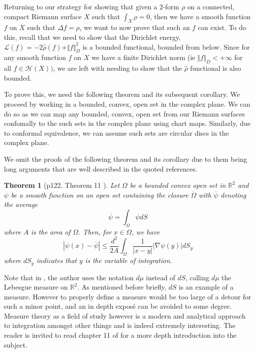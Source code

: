 \documentclass[11pt]{report}
\newtheorem{thm}{Theorem}[section]
\theoremstyle{definition}
\begin{document}
Returning to our strategy for showing that given a $2$-form $\rho$ on a connected, compact Riemann surface $X$ such that $\int_X \rho = 0$, then we have a smooth function $f$ on $X$ such that $\Delta f = \rho$, we want to now prove that such an $f$ can exist. To do this, recall that we need to show that the Dirichlet energy, $\mathcal{L}(f) = -2\hat{\rho}(f) + \Vert f \Vert^2_D$ is a bounded functional, bounded from below. Since for any smooth function $f$ on $X$ we have a finite Dirichlet norm (ie $\Vert f \Vert_D < +\infty $ for all $f \in \mathcal{H}(X))$, %
we are left with needing to show that the $\hat{\rho}$ functional is also bounded.

To prove this, we need the following theorem and its subsequent corollary. We proceed by working in a bounded, convex, open set in the complex plane. We can do so as we can map any bounded, convex, open set from our Riemann surfaces confomally to the such sets in the complex plane using chart maps. Similarly, due to conformal equivalence, we can assume such sets are circular discs in the complex plane.

We omit the proofs of the following theorem and its corollary due to them being long arguments that are well described in the quoted references.
\begin{thm}[p122. Theorem 11 \cite{donaldson}]\label{quotedTheorem11}
  Let $\Omega$ be a bounded convex open set in $\mathbb{R}^2$ and $\psi$ be a smooth function on an open set containing the closure $\overline{\Omega}$ with $\overline{\psi}$ denoting the average 
  \[\overline{\psi} = \int_{\Omega}\psi dS\] 
  where $A$ is the area of $\Omega$. Then, for $x \in \Omega$, we have 
  \[|\psi(x) - \overline{\psi}| \leq \frac{d^2}{2A}\int_\Omega \frac{1}{|x - y|}|\nabla\psi(y)|dS_y\] where $dS_y$ indicates that $y$ is the variable of integration.
\end{thm}
Note that in \cite{donaldson}, the author uses the notation $d\mu$ instead of $dS$, calling $d\mu$ the Lebesgue measure on $\mathbb{R}^2$. As mentioned before briefly, $dS$ is an example of a measure. However to properly define a measure would be too large of a detour for such a minor point, and an in depth expos\'{e} can be avoided to some degree. Measure theory as a field of study however is a modern and analytical approach to integration amongst other things and is indeed extremely interesting. The reader is invited to read chapter 11 of \cite{babyRudin} for a more depth introduction into the subject.
\end{document}
